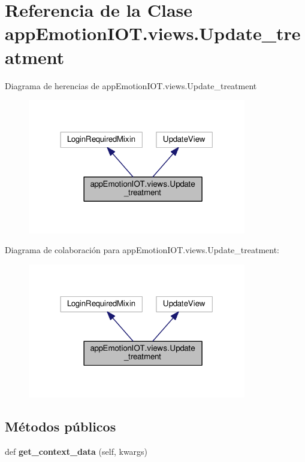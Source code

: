 \hypertarget{classappEmotionIOT_1_1views_1_1Update__treatment}{}\section{Referencia de la Clase app\+Emotion\+I\+O\+T.\+views.\+Update\+\_\+treatment}
\label{classappEmotionIOT_1_1views_1_1Update__treatment}


Diagrama de herencias de app\+Emotion\+I\+O\+T.\+views.\+Update\+\_\+treatment
\nopagebreak
\begin{figure}[H]
\begin{center}
\leavevmode
\includegraphics[width=270pt]{classappEmotionIOT_1_1views_1_1Update__treatment__inherit__graph}
\end{center}
\end{figure}


Diagrama de colaboración para app\+Emotion\+I\+O\+T.\+views.\+Update\+\_\+treatment\+:
\nopagebreak
\begin{figure}[H]
\begin{center}
\leavevmode
\includegraphics[width=270pt]{classappEmotionIOT_1_1views_1_1Update__treatment__coll__graph}
\end{center}
\end{figure}
\subsection*{Métodos públicos}
\begin{DoxyCompactItemize}
\item 
def {\bfseries get\+\_\+context\+\_\+data} (self, kwargs)\hypertarget{classappEmotionIOT_1_1views_1_1Update__treatment_a47d8e244338bdd551f63aeaa54742c2d}{}\label{classappEmotionIOT_1_1views_1_1Update__treatment_a47d8e244338bdd551f63aeaa54742c2d}

\end{DoxyCompactItemize}
